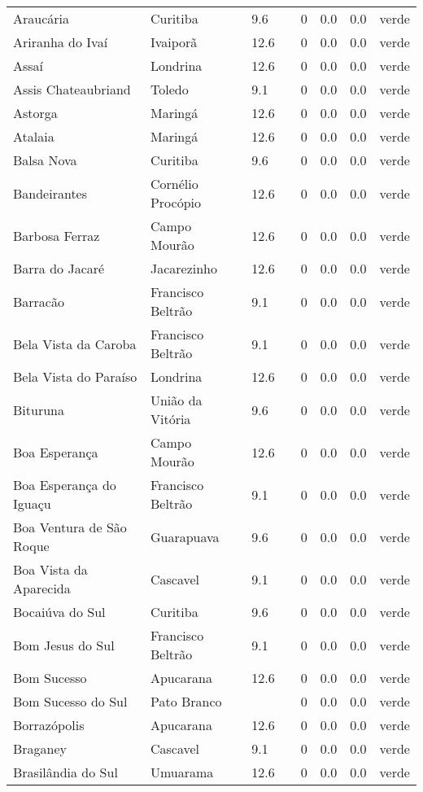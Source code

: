 \begin{longtable}{l|lllllll}
  Araucária & Curitiba & 9.6 &  & 0 & 0.0 & 0.0 & verde \\ 
  Ariranha do Ivaí & Ivaiporã & 12.6 &  & 0 & 0.0 & 0.0 & verde \\ 
  Assaí & Londrina & 12.6 &  & 0 & 0.0 & 0.0 & verde \\ 
  Assis Chateaubriand & Toledo & 9.1 &  & 0 & 0.0 & 0.0 & verde \\ 
  Astorga & Maringá & 12.6 &  & 0 & 0.0 & 0.0 & verde \\ 
  Atalaia & Maringá & 12.6 &  & 0 & 0.0 & 0.0 & verde \\ 
  Balsa Nova & Curitiba & 9.6 &  & 0 & 0.0 & 0.0 & verde \\ 
  Bandeirantes & Cornélio Procópio & 12.6 &  & 0 & 0.0 & 0.0 & verde \\ 
  Barbosa Ferraz & Campo Mourão & 12.6 &  & 0 & 0.0 & 0.0 & verde \\ 
  Barra do Jacaré & Jacarezinho & 12.6 &  & 0 & 0.0 & 0.0 & verde \\ 
  Barracão & Francisco Beltrão & 9.1 &  & 0 & 0.0 & 0.0 & verde \\ 
  Bela Vista da Caroba & Francisco Beltrão & 9.1 &  & 0 & 0.0 & 0.0 & verde \\ 
  Bela Vista do Paraíso & Londrina & 12.6 &  & 0 & 0.0 & 0.0 & verde \\ 
  Bituruna & União da Vitória & 9.6 &  & 0 & 0.0 & 0.0 & verde \\ 
  Boa Esperança & Campo Mourão & 12.6 &  & 0 & 0.0 & 0.0 & verde \\ 
  Boa Esperança do Iguaçu & Francisco Beltrão & 9.1 &  & 0 & 0.0 & 0.0 & verde \\ 
  Boa Ventura de São Roque & Guarapuava & 9.6 &  & 0 & 0.0 & 0.0 & verde \\ 
  Boa Vista da Aparecida & Cascavel & 9.1 &  & 0 & 0.0 & 0.0 & verde \\ 
  Bocaiúva do Sul & Curitiba & 9.6 &  & 0 & 0.0 & 0.0 & verde \\ 
  Bom Jesus do Sul & Francisco Beltrão & 9.1 &  & 0 & 0.0 & 0.0 & verde \\ 
  Bom Sucesso & Apucarana & 12.6 &  & 0 & 0.0 & 0.0 & verde \\ 
  Bom Sucesso do Sul & Pato Branco &  &  & 0 & 0.0 & 0.0 & verde \\ 
  Borrazópolis & Apucarana & 12.6 &  & 0 & 0.0 & 0.0 & verde \\ 
  Braganey & Cascavel & 9.1 &  & 0 & 0.0 & 0.0 & verde \\ 
  Brasilândia do Sul & Umuarama & 12.6 &  & 0 & 0.0 & 0.0 & verde \\ 

\end{longtable}
